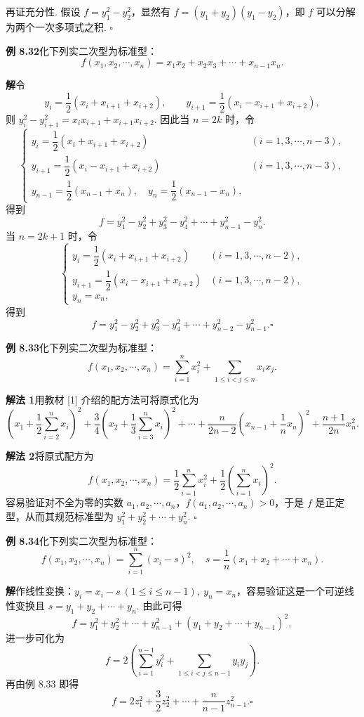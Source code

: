\documentclass[UTF8,12pt,a4paper,fontset=fandol]{ctexart}
\begin{document}
再证充分性. 假设 $f=y_1^2-y_2^2$，显然有 $f=(y_1+y_2)(y_1-y_2)$，即 $f$ 可以分解为两个一次多项式之积. $\ensuremath{\square}$

\noindent\textbf{例 8.32}\quad 化下列实二次型为标准型：
\[
f(x_1,x_2,\cdots,x_n)=x_1x_2+x_2x_3+\cdots+x_{n-1}x_n.
\]

\noindent\textbf{解}\quad 令
\[
y_i=\frac12(x_i+x_{i+1}+x_{i+2}),\qquad
y_{i+1}=\frac12(x_i-x_{i+1}+x_{i+2}),
\]
则 $y_i^2-y_{i+1}^2=x_ix_{i+1}+x_{i+1}x_{i+2}$. 因此当 $n=2k$ 时，令
\[
\left\{\begin{array}{ll}
y_i=\dfrac12(x_i+x_{i+1}+x_{i+2}) &(i=1,3,\cdots,n-3),\\
y_{i+1}=\dfrac12(x_i-x_{i+1}+x_{i+2}) &(i=1,3,\cdots,n-3),\\
y_{n-1}=\dfrac12(x_{n-1}+x_n),\quad y_n=\dfrac12(x_{n-1}-x_n),
\end{array}\right.
\]
得到
\[
f=y_1^2-y_2^2+y_3^2-y_4^2+\cdots+y_{n-1}^2-y_n^2.
\]
当 $n=2k+1$ 时，令
\[
\left\{\begin{array}{ll}
y_i=\dfrac12(x_i+x_{i+1}+x_{i+2}) &(i=1,3,\cdots,n-2),\\
y_{i+1}=\dfrac12(x_i-x_{i+1}+x_{i+2}) &(i=1,3,\cdots,n-2),\\
y_n=x_n,
\end{array}\right.
\]
得到
\[
f=y_1^2-y_2^2+y_3^2-y_4^2+\cdots+y_{n-2}^2-y_{n-1}^2. \ensuremath{\square}
\]

\noindent\textbf{例 8.33}\quad 化下列实二次型为标准型：
\[
f(x_1,x_2,\cdots,x_n)=\sum_{i=1}^n x_i^2+\sum_{1\le i<j\le n}x_ix_j.
\]

\noindent\textbf{解法 1}\quad 用教材 [1] 介绍的配方法可将原式化为
\[
\left(x_1+\frac12\sum_{i=2}^n x_i\right)^2
+\frac34\left(x_2+\frac13\sum_{i=3}^n x_i\right)^2+\cdots
+\frac{n}{2n-2}\left(x_{n-1}+\frac1n x_n\right)^2+\frac{n+1}{2n}x_n^2.
\]

\noindent\textbf{解法 2}\quad 将原式配方为
\[
f(x_1,x_2,\cdots,x_n)=\frac12\sum_{i=1}^n x_i^2+\frac12\left(\sum_{i=1}^n x_i\right)^2.
\]
容易验证对不全为零的实数 $a_1,a_2,\cdots,a_n$，$f(a_1,a_2,\cdots,a_n)>0$，于是 $f$ 是正定型，从而其规范标准型为 $y_1^2+y_2^2+\cdots+y_n^2$. $\ensuremath{\square}$

\noindent\textbf{例 8.34}\quad 化下列实二次型为标准型：
\[
f(x_1,x_2,\cdots,x_n)=\sum_{i=1}^n(x_i-s)^2,\quad s=\frac1n(x_1+x_2+\cdots+x_n).
\]

\noindent\textbf{解}\quad 作线性变换：$y_i=x_i-s\ (1\le i\le n-1),\ y_n=x_n$，容易验证这是一个可逆线性变换且 $s=y_1+y_2+\cdots+y_n$. 由此可得
\[
f=y_1^2+y_2^2+\cdots+y_{n-1}^2+(y_1+y_2+\cdots+y_{n-1})^2,
\]
进一步可化为
\[
f=2\left(\sum_{i=1}^{n-1}y_i^2+\sum_{1\le i<j\le n-1}y_iy_j\right).
\]
再由例 8.33 即得
\[
f=2z_1^2+\frac32z_2^2+\cdots+\frac{n}{n-1}z_{n-1}^2. \ensuremath{\square}
\]
\end{document}
